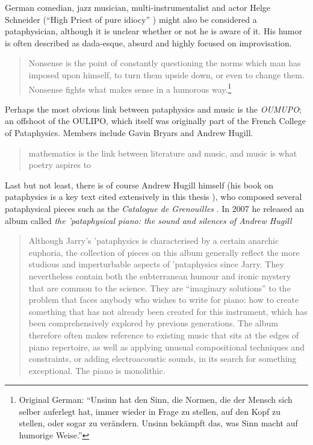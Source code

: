 German comedian, jazz musician, multi-instrumentalist and actor Helge Schneider (``High Priest of pure idiocy'' \autocite{Bolz1997}) might also be considered a pataphysician, although it is unclear whether or not he is aware of it. His humor is often described as dada-esque, absurd and highly focused on improvisation.

\begin{quotation}
  Nonsense is the point of constantly questioning the norms which man has imposed upon himself, to turn them upside down, or even to change them. Nonsense fights what makes sense in a humorous way.\footnote{Original German: ``Unsinn hat den Sinn, die Normen, die der Mensch sich selber auferlegt hat, immer wieder in Frage zu stellen, auf den Kopf zu stellen, oder sogar zu verändern. Unsinn bekämpft das, was Sinn macht auf humorige Weise.''}
\end{quotation}

Perhaps the most obvious link between pataphysics and music is the \emph{OUMUPO}; an offshoot of the \ac{OULIPO}, which itself was originally part of the French College of Pataphysics. Members include Gavin Bryars and Andrew Hugill. 

\begin{quotation}
  mathematics is the link between literature and music, and music is what poetry aspires to 
\end{quotation}

Last but not least, there is of course Andrew Hugill himself (his book on pataphysics is a key text cited extensively in this thesis \autocite[see][]{Hugill2012}), who composed several pataphysical pieces such as the \textit{Catalogue de Grenouilles} \autocite{Hugill1987} \autocite[see][for a full catalogue of his work]{Hugill2015}. In 2007 he released an album called \textit{the {'}pataphysical piano: the sound and silences of Andrew Hugill} \autocite{Hugill2007}

\begin{quotation}
  Although Jarry's {'}pataphysics is characterised by a certain anarchic euphoria, the collection of pieces on this album generally reflect the more studious and imperturbable aspects of {'}pataphysics since Jarry. They nevertheless contain both the subterranean humour and ironic mystery that are common to the science. They are ``imaginary solutions'' to the problem that faces anybody who wishes to write for piano: how to create something that has not already been created for this instrument, which has been comprehensively explored by previous generations. The album therefore often makes reference to existing music that sits at the edges of piano repertoire, as well as applying unusual compositional techniques and constraints, or adding electroacoustic sounds, in its search for something exceptional. The piano is monolithic. 
\end{quotation}


